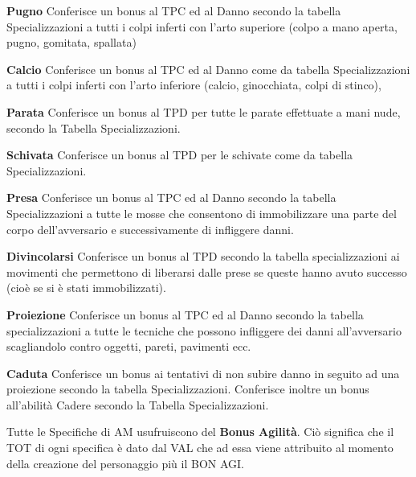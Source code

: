 \begin{description}
\item{\bf Pugno} Conferisce un bonus al
TPC ed al Danno secondo la tabella Specializzazioni a tutti i colpi
inferti con l'arto superiore (colpo a mano aperta, pugno, gomitata,
spallata)
\item{\bf Calcio} Conferisce un bonus al TPC ed al Danno come
da tabella Specializzazioni a tutti i colpi inferti con l'arto
inferiore (calcio, ginocchiata, colpi di stinco),

\item{\bf Parata}
Conferisce un bonus al TPD per tutte le parate effettuate a mani nude,
secondo la Tabella Specializzazioni.

\item{\bf Schivata} Conferisce un
bonus al TPD per le schivate come da tabella Specializzazioni.

\item{\bf Presa} Conferisce un bonus al TPC ed al Danno secondo la
tabella Specializzazioni a tutte le mosse che consentono di
immobilizzare una parte del corpo dell'avversario e successivamente di
infliggere danni.

\item{\bf Divincolarsi} Conferisce un bonus al TPD
secondo la tabella specializzazioni ai movimenti che permettono di
liberarsi dalle prese se queste hanno avuto successo (cio\`e se si
\`e stati immobilizzati). 

\item{\bf Proiezione} Conferisce un bonus al
TPC ed al Danno secondo la tabella specializzazioni a tutte le
tecniche che possono infliggere dei danni all'avversario scagliandolo
contro oggetti, pareti, pavimenti ecc.

\item{\bf Caduta} Conferisce un
bonus ai tentativi di non subire danno in seguito ad una proiezione
secondo la tabella Specializzazioni. Conferisce inoltre un bonus
all'abilit\`a Cadere secondo la Tabella Specializzazioni. 

\end{description}

Tutte le Specifiche di AM usufruiscono del \textbf{Bonus Agilit\`a}.
Ci\`o significa che il TOT di ogni specifica \`e dato dal VAL che ad
essa viene attribuito al momento della creazione del personaggio pi\`u
il BON AGI.


